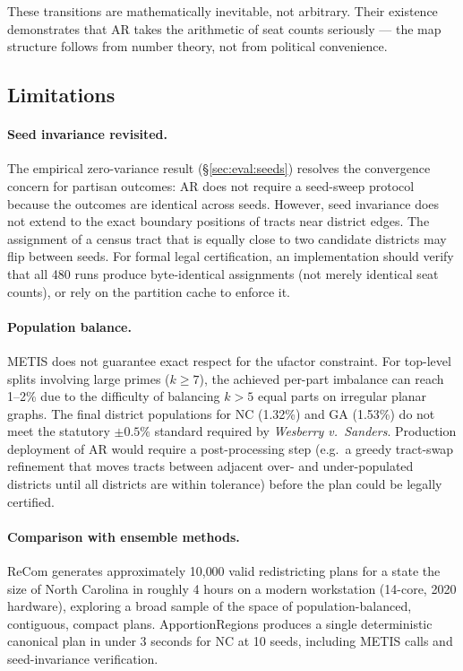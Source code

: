 These transitions are mathematically inevitable, not arbitrary. Their
existence demonstrates that AR takes the arithmetic of seat counts seriously
--- the map structure follows from number theory, not from political convenience.

\subsection{Limitations}
\label{sec:discussion:limitations}

\paragraph{Seed invariance revisited.}
The empirical zero-variance result (\S\ref{sec:eval:seeds}) resolves the
convergence concern for partisan outcomes: AR does not require a seed-sweep
protocol because the outcomes are identical across seeds. However, seed
invariance does not extend to the exact boundary positions of tracts near
district edges. The assignment of a census tract that is equally close to two
candidate districts may flip between seeds. For formal legal certification, an
implementation should verify that all 480 runs produce byte-identical
assignments (not merely identical seat counts), or rely on the partition cache
to enforce it.

\paragraph{Population balance.}
METIS does not guarantee exact respect for the ufactor constraint. For
top-level splits involving large primes ($k \geq 7$), the achieved per-part
imbalance can reach 1--2\% due to the difficulty of balancing $k > 5$ equal
parts on irregular planar graphs. The final district populations for NC
(1.32\%) and GA (1.53\%) do not meet the statutory $\pm 0.5\%$ standard
required by \emph{Wesberry v.\ Sanders}. Production deployment of AR would
require a post-processing step (e.g.\ a greedy tract-swap refinement that
moves tracts between adjacent over- and under-populated districts until all
districts are within tolerance) before the plan could be legally certified.

\paragraph{Comparison with ensemble methods.}
ReCom \citep{deford2019recombination} generates approximately 10{,}000 valid
redistricting plans for a state the size of North Carolina in roughly 4 hours
on a modern workstation (14-core, 2020 hardware), exploring a broad sample of
the space of population-balanced, contiguous, compact plans.
ApportionRegions produces a single deterministic canonical plan in under 3 seconds
for NC at 10 seeds, including METIS calls and seed-invariance verification.

